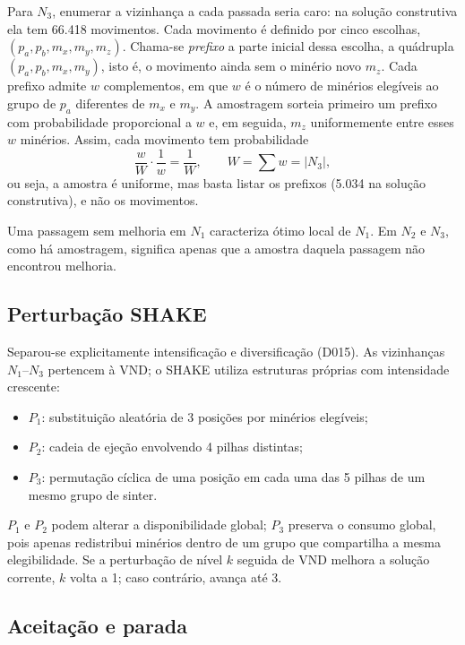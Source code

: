\documentclass[10pt,twocolumn,a4paper]{article}
\begin{document}
Para $N_3$, enumerar a vizinhança a cada passada seria caro: na solução construtiva ela tem 66.418 movimentos. Cada movimento é definido por cinco escolhas, $(p_a, p_b, m_x, m_y, m_z)$. Chama-se \emph{prefixo} a parte inicial dessa escolha, a quádrupla $(p_a, p_b, m_x, m_y)$, isto é, o movimento ainda sem o minério novo $m_z$. Cada prefixo admite $w$ complementos, em que $w$ é o número de minérios elegíveis ao grupo de $p_a$ diferentes de $m_x$ e $m_y$. A amostragem sorteia primeiro um prefixo com probabilidade proporcional a $w$ e, em seguida, $m_z$ uniformemente entre esses $w$ minérios. Assim, cada movimento tem probabilidade
\begin{equation}
\frac{w}{W} \cdot \frac{1}{w} = \frac{1}{W}, \qquad W = \sum w = |N_3|,
\end{equation}
ou seja, a amostra é uniforme, mas basta listar os prefixos (5.034 na solução construtiva), e não os movimentos.

Uma passagem sem melhoria em $N_1$ caracteriza ótimo local de $N_1$. Em $N_2$ e $N_3$, como há amostragem, significa apenas que a amostra daquela passagem não encontrou melhoria.

\subsection{Perturbação SHAKE}

Separou-se explicitamente intensificação e diversificação (D015). As vizinhanças $N_1$--$N_3$ pertencem à VND; o SHAKE utiliza estruturas próprias com intensidade crescente:
\begin{itemize}
    \item $P_1$: substituição aleatória de 3 posições por minérios elegíveis;
    \item $P_2$: cadeia de ejeção envolvendo 4 pilhas distintas;
    \item $P_3$: permutação cíclica de uma posição em cada uma das 5 pilhas de um mesmo grupo de sinter.
\end{itemize}
$P_1$ e $P_2$ podem alterar a disponibilidade global; $P_3$ preserva o consumo global, pois apenas redistribui minérios dentro de um grupo que compartilha a mesma elegibilidade. Se a perturbação de nível $k$ seguida de VND melhora a solução corrente, $k$ volta a 1; caso contrário, avança até 3.

\subsection{Aceitação e parada}
\end{document}
